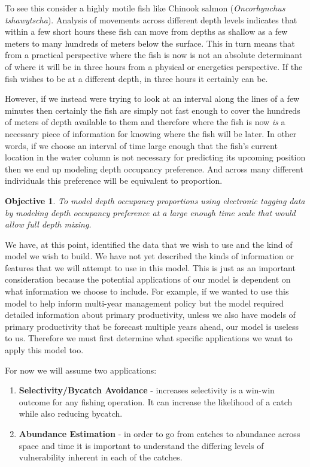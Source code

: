\documentclass[11pt]{article}
\newtheorem{objective}{Objective}
\begin{document}
To see this consider a highly motile fish like Chinook salmon (\textit{Oncorhynchus tshawytscha}). Analysis of movements across different depth levels indicates that within a few short hours these fish can move from depths as shallow as a few meters to many hundreds of meters below the surface. This in turn means that from a practical perspective where the fish is now is not an absolute determinant of where it will be in three hours from a physical or energetics perspective. If the fish wishes to be at a different depth, in three hours it certainly can be. 

However, if we instead were trying to look at an interval along the lines of a few minutes then certainly the fish are simply not fast enough to cover the hundreds of meters of depth available to them and therefore where the fish is now \textit{is} a necessary piece of information for knowing where the fish will be later. In other words, if we choose an interval of time large enough that the fish's current location in the water column is not necessary for predicting its upcoming position then we end up modeling depth occupancy preference. And across many different individuals this preference will be equivalent to proportion.  \newline

\begin{objective}
To model depth occupancy proportions using electronic tagging data by modeling depth occupancy preference at a large enough time scale that would allow full depth mixing. 
\end{objective}

We have, at this point, identified the data that we wish to use and the kind of model we wish to build. We have not yet described the kinds of information or features that we will attempt to use in this model. This is just as an important consideration because the potential applications of our model is dependent on what information we choose to include. For example, if we wanted to use this model to help inform multi-year management policy but the model required detailed information about primary productivity, unless we also have models of primary productivity that be forecast multiple years ahead, our model is useless to us. Therefore we must first determine what specific applications we want to apply this model too. 

For now we will assume two applications:

\begin{enumerate}
\item \textbf{Selectivity/Bycatch Avoidance} - increases selectivity is a win-win outcome for any fishing operation. It can increase the likelihood of a catch while also reducing bycatch.
\item \textbf{Abundance Estimation} - in order to go from catches to abundance across space and time it is important to understand the differing levels of vulnerability inherent in each of the catches. 
\end{enumerate}
\end{document}
